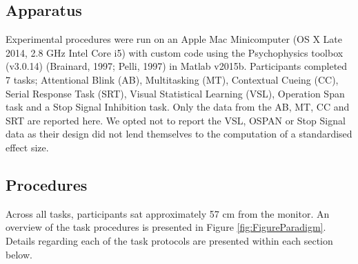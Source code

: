 \documentclass[
  man]{apa6}
\begin{document}
\hypertarget{apparatus}{%
\subsection{Apparatus}\label{apparatus}}

\label{sec:Apparatus}

Experimental procedures were run on an Apple Mac Minicomputer (OS X Late 2014, 2.8 GHz Intel Core i5) with custom code using the Psychophysics toolbox (v3.0.14) (Brainard, 1997; Pelli, 1997) in Matlab v2015b. Participants completed 7 tasks; Attentional Blink (AB), Multitasking (MT), Contextual Cueing (CC), Serial Response Task (SRT), Visual Statistical Learning (VSL), Operation Span task and a Stop Signal Inhibition task. Only the data from the AB, MT, CC and SRT are reported here. We opted not to report the VSL, OSPAN or Stop Signal data as their design did not lend themselves to the computation of a standardised effect size.

\hypertarget{procedures}{%
\subsection{Procedures}\label{procedures}}

\label{sec:Procedures}

Across all tasks, participants sat approximately 57 cm from the monitor. An overview of the task procedures is presented in Figure \ref{fig:FigureParadigm}. Details regarding each of the task protocols are presented within each section below.
\end{document}
